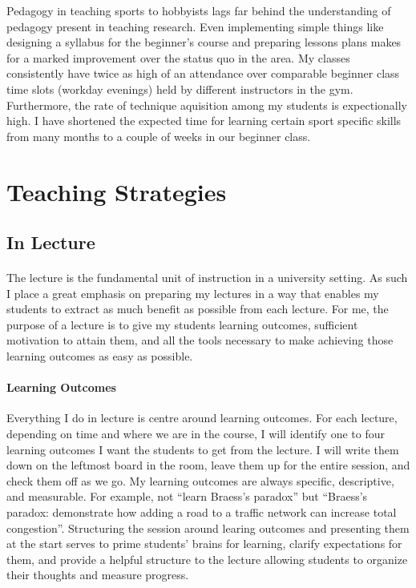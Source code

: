 \documentclass{article}
\begin{document}
Pedagogy in teaching sports to hobbyists lags far behind the understanding of pedagogy present in teaching research. Even implementing simple things like designing a syllabus for the beginner's course and preparing lessons plans makes for a marked improvement over the status quo in the area. My classes consistently have twice as high of an attendance over comparable beginner class time slots (workday evenings) held by different instructors in the gym. Furthermore, the rate of technique aquisition among my students is expectionally high. I have shortened the expected time for learning certain sport specific skills from many months to a couple of weeks in our beginner class.

\section{Teaching Strategies}
\subsection{In Lecture}
\paragraph{}
The lecture is the fundamental unit of instruction in a university setting. As such I place a great emphasis on preparing my lectures in a way that enables my students to extract as much benefit as possible from each lecture. For me, the purpose of a lecture is to give my students learning outcomes, sufficient motivation to attain them, and all the tools necessary to make achieving those learning outcomes as easy as possible.

\paragraph{Learning Outcomes}Everything I do in lecture is centre around learning outcomes. For each lecture, depending on time and where we are in the course, I will identify one to four learning outcomes I want the students to get from the lecture. I will write them down on the leftmost board in the room, leave them up for the entire session, and check them off as we go. My learning outcomes are always specific, descriptive, and measurable. For example, not ``learn Braess's paradox'' but ``Braess's paradox: demonstrate how adding a road to a traffic network can increase total congestion''. Structuring the session around learing outcomes and presenting them at the start serves to prime students' brains for learning, clarify expectations for them, and provide a helpful structure to the lecture allowing students to organize their thoughts and measure progress.
\end{document}
